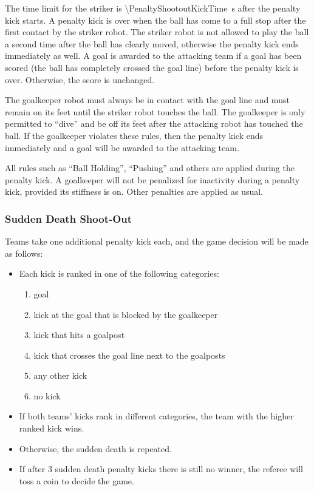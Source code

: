 The time limit for the striker is \qty{\PenaltyShootoutKickTime}{\second} after the penalty kick starts.
A penalty kick is over when the ball has come to a full stop after the first contact by the striker robot.
The striker robot is not allowed to play the ball a second time after the ball has clearly moved, otherwise the penalty kick ends immediately as well.
A goal is awarded to the attacking team if a goal has been scored (\ie the ball has completely crossed the goal line) before the penalty kick is over.
Otherwise, the score is unchanged.

The goalkeeper robot must always be in contact with the goal line and must remain on its feet until the striker robot touches the ball.
The goalkeeper is only permitted to ``dive'' and be off its feet after the attacking robot has touched the ball.
If the goalkeeper violates these rules, then the penalty kick ends immediately and a goal will be awarded to the attacking team.

All rules such as ``Ball Holding'', ``Pushing'' and others are applied during the penalty kick.
A goalkeeper will not be penalized for inactivity during a penalty kick, provided its stiffness is on.
Other penalties are applied as usual.

\subsubsection{Sudden Death Shoot-Out}
\label{sec:sudden_death_shoot_out}

Teams take one additional penalty kick each, and the game decision will be made as follows:
\begin{itemize}
  \item Each kick is ranked in one of the following categories:
  \begin{enumerate}
    \item goal
    \item kick at the goal that is blocked by the goalkeeper
    \item kick that hits a goalpost
    \item kick that crosses the goal line next to the goalposts
    \item any other kick
    \item no kick
  \end{enumerate}
  \item If both teams' kicks rank in different categories, the team with the higher ranked kick wins.
  \item Otherwise, the sudden death is repeated.
  \item If after 3 sudden death penalty kicks there is still no winner, the referee will toss a coin to decide the game.
\end{itemize}
